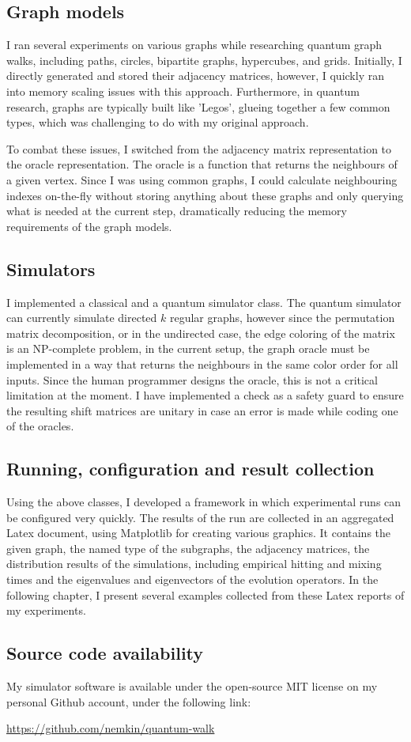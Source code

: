 \subsection{Graph models}

I ran several experiments on various graphs while researching quantum graph walks, including paths, circles, bipartite graphs, hypercubes, and grids. Initially, I directly generated and stored their adjacency matrices, however, I quickly ran into memory scaling issues with this approach. Furthermore, in quantum research, graphs are typically built like 'Legos', glueing together a few common types, which was challenging to do with my original approach.

To combat these issues, I switched from the adjacency matrix representation to the oracle representation. The oracle is a function that returns the neighbours of a given vertex. Since I was using common graphs, I could calculate neighbouring indexes on-the-fly without storing anything about these graphs and only querying what is needed at the current step, dramatically reducing the memory requirements of the graph models.

\subsection{Simulators}

I implemented a classical and a quantum simulator class. The quantum simulator can currently simulate directed $k$ regular graphs, however since the permutation matrix decomposition, or in the undirected case, the edge coloring of the matrix is an NP-complete problem, in the current setup, the graph oracle must be implemented in a way that returns the neighbours in the same color order for all inputs. Since the human programmer designs the oracle, this is not a critical limitation at the moment. I have implemented a check as a safety guard to ensure the resulting shift matrices are unitary in case an error is made while coding one of the oracles.

\subsection{Running, configuration and result collection}

Using the above classes, I developed a framework in which experimental runs can be configured very quickly. The results of the run are collected in an aggregated Latex document, using Matplotlib for creating various graphics. It contains the given graph, the named type of the subgraphs, the adjacency matrices, the distribution results of the simulations, including empirical hitting and mixing times and the eigenvalues and eigenvectors of the evolution operators. In the following chapter, I present several examples collected from these Latex reports of my experiments.

\subsection{Source code availability}

My simulator software is available under the open-source MIT license on my personal Github account, under the following link:

\url{https://github.com/nemkin/quantum-walk}
